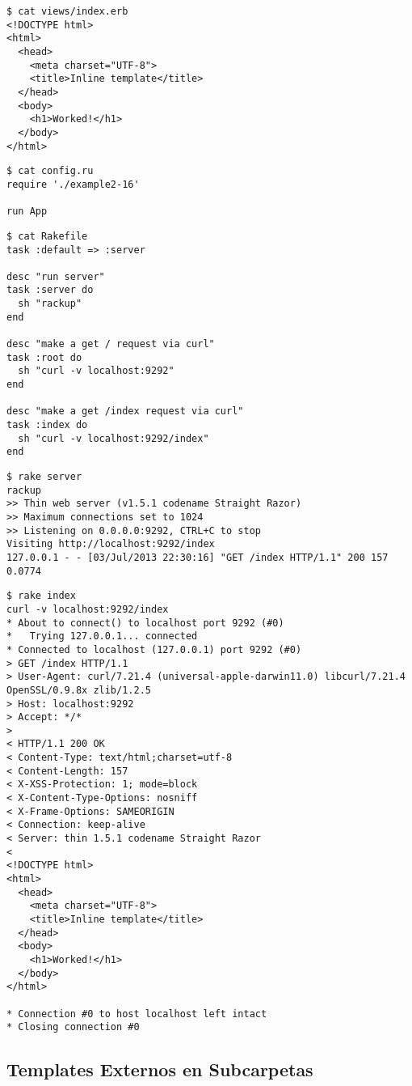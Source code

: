 \begin{verbatim}
$ cat views/index.erb 
<!DOCTYPE html>
<html> 
  <head>
    <meta charset="UTF-8">
    <title>Inline template</title> 
  </head>
  <body> 
    <h1>Worked!</h1>
  </body> 
</html>
\end{verbatim}

\begin{verbatim}
$ cat config.ru 
require './example2-16'

run App
\end{verbatim}

\begin{verbatim}
$ cat Rakefile 
task :default => :server

desc "run server"
task :server do
  sh "rackup"
end

desc "make a get / request via curl"
task :root do
  sh "curl -v localhost:9292"
end

desc "make a get /index request via curl"
task :index do 
  sh "curl -v localhost:9292/index"
end
\end{verbatim}

\begin{verbatim}
$ rake server
rackup
>> Thin web server (v1.5.1 codename Straight Razor)
>> Maximum connections set to 1024
>> Listening on 0.0.0.0:9292, CTRL+C to stop
Visiting http://localhost:9292/index
127.0.0.1 - - [03/Jul/2013 22:30:16] "GET /index HTTP/1.1" 200 157 0.0774
\end{verbatim}

\begin{verbatim}
$ rake index
curl -v localhost:9292/index
* About to connect() to localhost port 9292 (#0)
*   Trying 127.0.0.1... connected
* Connected to localhost (127.0.0.1) port 9292 (#0)
> GET /index HTTP/1.1
> User-Agent: curl/7.21.4 (universal-apple-darwin11.0) libcurl/7.21.4 OpenSSL/0.9.8x zlib/1.2.5
> Host: localhost:9292
> Accept: */*
> 
< HTTP/1.1 200 OK
< Content-Type: text/html;charset=utf-8
< Content-Length: 157
< X-XSS-Protection: 1; mode=block
< X-Content-Type-Options: nosniff
< X-Frame-Options: SAMEORIGIN
< Connection: keep-alive
< Server: thin 1.5.1 codename Straight Razor
< 
<!DOCTYPE html>
<html> 
  <head>
    <meta charset="UTF-8">
    <title>Inline template</title> 
  </head>
  <body> 
    <h1>Worked!</h1>
  </body> 
</html>

* Connection #0 to host localhost left intact
* Closing connection #0
\end{verbatim}

\subsection{Templates Externos en Subcarpetas}


